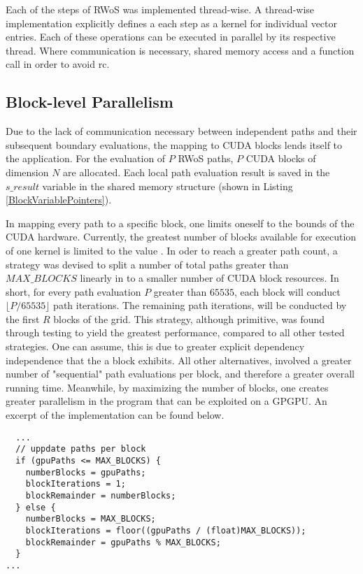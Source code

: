 Each of the steps of \Gls{RWoS} was implemented thread-wise.  A thread-wise implementation
explicitly defines a each step as a kernel for individual vector entries.  Each of these operations
can be executed in parallel by its respective thread.  Where communication is necessary,
shared memory access and a function call  in order to avoid \Gls{rc}.

\subsection{Block-level Parallelism}
Due to the lack of communication necessary between independent paths and
their subsequent boundary evaluations, the mapping to \Gls{CUDA} blocks lends itself
to the  application.  For the evaluation of $P$ \Gls{RWoS} paths, $P$ CUDA blocks
of dimension $N$ are allocated.  Each local path evaluation result is saved in the $s\_result$
variable in the shared memory structure (shown in Listing \ref{BlockVariablePointers}).
\par
In mapping every path to a specific block, one limits oneself to the bounds of the
CUDA hardware.  Currently, the greatest number of blocks available for execution
of one kernel is limited to the value .  In oder to reach a greater
path count, a strategy was devised to split a number of total paths greater
than $MAX\_BLOCKS$ linearly in to a smaller number of \Gls{CUDA} block resources.  In short,
for every path evaluation $P$ greater than $65535$, each block will conduct $\lfloor P/65535 \rfloor$
path iterations. The remaining path iterations,  will be conducted
 by the first $R$ blocks of the grid.  This strategy,
although primitive, was found through testing to yield the greatest performance,
compared to all other tested strategies. One can assume, this is due to greater
explicit dependency independence that the a block exhibits.  All other alternatives,
involved a greater number of "sequential" path evaluations per block, and therefore
a greater overall running time.   Meanwhile, by maximizing the number of blocks,
one creates greater parallelism in the program that can be exploited on a \Gls{GPGPU}.
An excerpt of the implementation can be found below.
\begin{listing}
\label{block-parallelism-strategy}
\begin{verbatim}
  ...
  // uppdate paths per block
  if (gpuPaths <= MAX_BLOCKS) {
    numberBlocks = gpuPaths;
    blockIterations = 1;
    blockRemainder = numberBlocks;
  } else {
    numberBlocks = MAX_BLOCKS;
    blockIterations = floor((gpuPaths / (float)MAX_BLOCKS));
    blockRemainder = gpuPaths % MAX_BLOCKS;
  }
...
\end{verbatim}
\end{listing}

